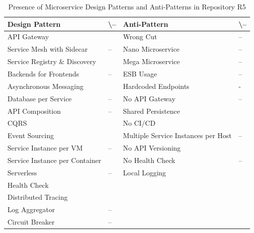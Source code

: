 \documentclass{Configuration_Files/PoliMi3i_thesis}
\newcommand{\cmark}{\ding{51}}%
\begin{document}
\begin{table}[H]
\centering 
    \begin{tabular}{ 
  | >{\centering\arraybackslash} m{16em} 
  | >{\centering\arraybackslash} m{2.2em} 
  | >{\centering\arraybackslash} m{16em} 
  | >{\centering\arraybackslash} m{2.2em} | }
    \hline
    \rowcolor{bluepoli!40}
    \textbf{Design Pattern} & \cmark \textbackslash – & \textbf{Anti-Pattern} & \cmark \textbackslash – \T\B \\
    \hline \hline
    API Gateway & \cmark & Wrong Cut & – \T\B\\
    \hline
    \rowcolor{bluepoli!10}
    Service Mesh with Sidecar & – & Nano Microservice & – \T\B \\
    \hline
    Service Registry \& Discovery & \cmark & Mega Microservice & – \T\B \\
    \hline
    \rowcolor{bluepoli!10}
    Backends for Frontends & – & ESB Usage & – \T\B \\
    \hline
    Asynchronous Messaging & \cmark & Hardcoded Endpoints & - \T\B \\
    \hline
    \rowcolor{bluepoli!10}
    Database per Service & – & No API Gateway & – \T\B \\
    \hline
    API Composition & – & Shared Persistence & \cmark \T\B \\
    \hline
    \rowcolor{bluepoli!10}
    CQRS & \cmark & No CI/CD & \cmark \T\B \\
    \hline
    Event Sourcing & \cmark & Multiple Service Instances per Host & – \T\B \\
    \hline
    \rowcolor{bluepoli!10}
    Service Instance per VM & – & No API Versioning & \cmark \T\B \\
    \hline
    Service Instance per Container & \cmark & No Health Check & – \T\B \\
    \hline
    \rowcolor{bluepoli!10}
    Serverless & – & Local Logging & \cmark \T\B \\
    \hline
    Health Check & \cmark &  & \T\B \\
    \hline
    \rowcolor{bluepoli!10}
    Distributed Tracing & \cmark & & \T\B \\
    \hline
    Log Aggregator & – &  & \T\B \\
    \hline
    \rowcolor{bluepoli!10}
    Circuit Breaker & – &  & \T\B \\
    \hline
    \end{tabular}
    \\[10pt]
    \caption{Presence of Microservice Design Patterns and Anti-Patterns in Repository R5}
    \label{table:R5_result}
\end{table}
\end{document}

